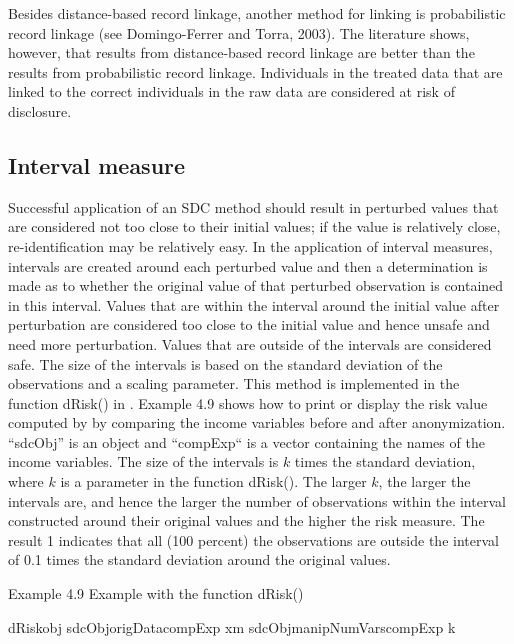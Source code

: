 \documentclass[letterpaper,10pt,english]{sphinxmanual}
\begin{document}
Besides distance-based record linkage, another method for linking is
probabilistic record linkage (see Domingo-Ferrer and Torra, 2003). The
literature shows, however, that results from distance-based record
linkage are better than the results from probabilistic record linkage.
Individuals in the treated data that are linked to the correct
individuals in the raw data are considered at risk of disclosure.


\subsection{Interval measure}
\label{\detokenize{measure_risk:interval-measure}}
Successful application of an SDC method should result in perturbed
values that are considered not too close to their initial values; if the
value is relatively close, re-identification may be relatively easy. In
the application of interval measures, intervals are created around each
perturbed value and then a determination is made as to whether the
original value of that perturbed observation is contained in this
interval. Values that are within the interval around the initial value
after perturbation are considered too close to the initial value and
hence unsafe and need more perturbation. Values that are outside of the
intervals are considered safe. The size of the intervals is based on the
standard deviation of the observations and a scaling parameter. This
method is implemented in the function dRisk() in . Example 4.9
shows how to print or display the risk value computed by  by
comparing the income variables before and after anonymization. “sdcObj”
is an  object and “compExp“ is a vector containing the names
of the income variables. The size of the intervals is \(k\) times
the standard deviation, where \(k\) is a parameter in the function
dRisk(). The larger \(k\), the larger the intervals are, and hence
the larger the number of observations within the interval constructed
around their original values and the higher the risk measure. The result
1 indicates that all (100 percent) the observations are outside the
interval of 0.1 times the standard deviation around the original values.

Example 4.9 Example with the function dRisk()

%
\begin{sphinxVerbatim}[commandchars=\\\{\}]
dRiskobj  sdcObjorigData\PYG{p}{[}compExp\PYG{p}{]} xm  sdcObjmanipNumVars\PYG{p}{[}compExp\PYG{p}{]} k  
\PYG{p}{[}\PYG{p}{]} 
\end{sphinxVerbatim}
\end{document}
